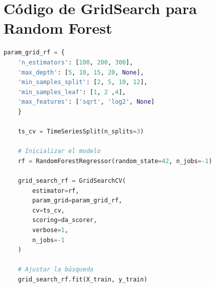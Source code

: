 \section{Código de GridSearch para Random Forest}
\label{sec:codigo_grid_search_rf}
\begin{lstlisting}[language=Python, caption=Implementación del GridSearch para Random Forest, label=lst:grid_search_rf]
    param_grid_rf = {
    'n_estimators': [100, 200, 300], 
    'max_depth': [5, 10, 15, 20, None], 
    'min_samples_split': [2, 5, 10, 12], 
    'min_samples_leaf': [1, 2 ,4], 
    'max_features': ['sqrt', 'log2', None]
    } 

    ts_cv = TimeSeriesSplit(n_splits=3) 

    # Inicializar el modelo
    rf = RandomForestRegressor(random_state=42, n_jobs=-1) 

    grid_search_rf = GridSearchCV(
        estimator=rf,
        param_grid=param_grid_rf,
        cv=ts_cv,
        scoring=da_scorer,
        verbose=1,
        n_jobs=-1
    )  

    # Ajustar la búsqueda
    grid_search_rf.fit(X_train, y_train) 
\end{lstlisting}

